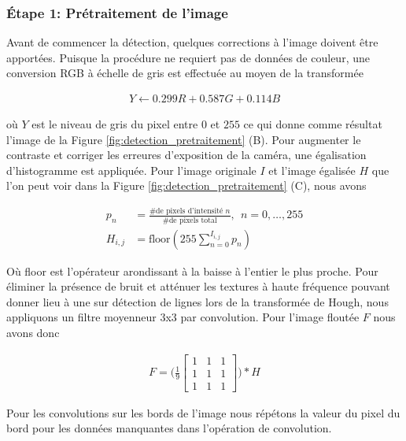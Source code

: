 \subsubsection{Étape 1: Prétraitement de l'image} Avant de commencer la détection, quelques corrections à l'image doivent être apportées. Puisque la procédure ne requiert pas de données de couleur, une conversion RGB à échelle de gris est effectuée au moyen de la transformée

\begin{align}
 Y \leftarrow 0.299 R + 0.587 G + 0.114 B
 \label{eq:rgb2gray}
\end{align}

où $Y$ est le niveau de gris du pixel entre $0$ et $255$ ce qui donne comme résultat l'image de la Figure \ref{fig:detection_pretraitement} (B). Pour augmenter le contraste et corriger les erreures d'exposition de la caméra, une égalisation d'histogramme est appliquée. Pour l'image originale $I$ et l'image égalisée $H$ que l'on peut voir dans la Figure \ref{fig:detection_pretraitement} (C), nous avons

\begin{align}
  p_n &= \frac{\text{\# de pixels d'intensité } n }{\text{\# de pixels total}}, \ \ n = 0, \ldots, 255 \\
  H_{i,j} &= \text{floor}(255 \sum_{n=0}^{I_{i,j}} p_n)
  \label{eq:egalisation_histogramme}
\end{align}

Où floor est l'opérateur arondissant à la baisse à l'entier le plus proche. Pour éliminer la présence de bruit et atténuer les textures à haute fréquence pouvant donner lieu à une sur détection de lignes lors de la transformée de Hough, nous appliquons un filtre moyenneur 3x3 par convolution. Pour l'image floutée $F$ nous avons donc

\begin{align}
  F = \Bigg(\frac{1}{9}
    \begin{bmatrix}
      1 & 1 & 1\\
      1 & 1 & 1\\
      1 & 1 & 1
    \end{bmatrix}
  \Bigg) * H
  \label{eq:boxfilter}
\end{align}

Pour les convolutions sur les bords de l'image nous répétons la valeur du pixel du bord pour les données manquantes dans l'opération de convolution.

